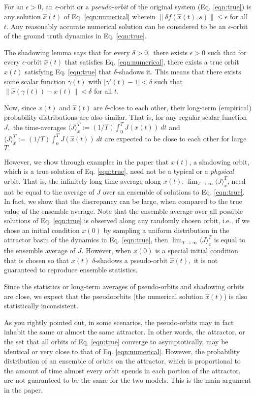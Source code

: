 \documentclass[11pt]{article}
\begin{document}
For an $\epsilon >0$, an $\epsilon$-orbit or a {\em pseudo-orbit} of the original system (Eq. \ref{eqn:true}) is any solution $\hat{x}(t)$ of Eq. \ref{eqn:numerical} wherein $\|\delta f(\hat{x}(t), s)\| \leq \epsilon$ for all $t$. Any reasonably accurate numerical solution can be considered to be an $\epsilon$-orbit of the ground truth dynamics in Eq. \ref{eqn:true}.

The shadowing lemma says that for every $\delta > 0,$ there exists $\epsilon > 0$ such that for every $\epsilon$-orbit $\hat{x}(t)$ that satisfies Eq. \ref{eqn:numerical}, there exists a true orbit $x(t)$ satisfying Eq. \ref{eqn:true} that $\delta$-shadows it. This means that there exists some scalar function $\gamma(t)$ with $|\gamma'(t) - 1| < \delta$ such that $\| \hat{x}(\gamma(t)) - x(t) \| < \delta$ for all $t.$

Now, since $x(t)$ and $\hat{x}(t)$ are $\delta$-close to each other, their long-term (empirical) probability distributions are also similar. That is, for any regular scalar function $J,$ the time-averages $\langle J\rangle_x^T := (1/T)\int_0^T J(x(t))\: dt$ and 
$\langle J\rangle_{\hat{x}}^T := (1/T) \int_0^T J(\hat{x}(t)) \: dt$ are expected to be close to each other for large $T.$ 

However, we show through examples in the paper that $x(t)$, a shadowing orbit, which is a true solution of Eq. \ref{eqn:true}, need not be a typical or a {\em physical} orbit. That is, the infinitely-long time average along $x(t)$, $\lim_{T\to\infty} \langle J\rangle_x^T$, need not be equal to the average of $J$ over an ensemble of solutions to Eq. \ref{eqn:true}. In fact, we show that the discrepancy can be large, when compared to the true value of the ensemble average. Note that the ensemble average over all possible solutions of Eq. \ref{eqn:true} is observed along any randomly chosen orbit, i.e., if we chose an initial condition $x(0)$ by sampling a uniform distribution in the attractor basin of the dynamics in Eq. \ref{eqn:true}, then $\lim_{T\to\infty}\langle J\rangle_x^T$ is equal to the ensemble average of $J.$ However, when $x(0)$ is a special initial condition that is chosen so that $x(t)$ $\delta$-shadows a pseudo-orbit $\hat{x}(t),$ it is not guaranteed to reproduce ensemble statistics.

Since the statistics or long-term averages of pseudo-orbits and shadowing orbits are close, we expect that the pseudoorbits (the numerical solution $\hat{x}(t)$) is also statistically inconsistent. 

As you rightly pointed out, in some scenarios, the pseudo-orbits may in fact inhabit the same or almost the same attractor. In other words, the attractor, or the set that all orbits of Eq. \ref{eqn:true} converge to asymptotically, may be identical or very close to that of Eq. \ref{eqn:numerical}. However, the probability distribution of an ensemble of orbits on the attractor, which is proportional to the amount of time almost every orbit spends in each portion of the attractor, are not guaranteed to be the same for the two models. This is the main argument in the paper.
\end{document}
